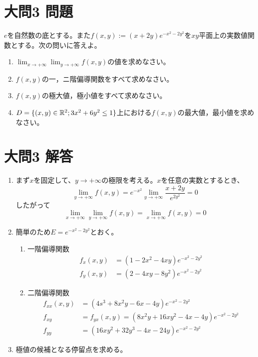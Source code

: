 \documentclass[dvipdfmx]{jsreport}
\begin{document}
\section{大問3 問題}
\begin{tcolorbox} %
	$e$を自然数の底とする。また$f(x, y):= (x+ 2y)e^{-x^2- 2y^2}$を$xy$平面上の実数値関数とする。次の問いに答えよ。
\begin{enumerate}
	\item $\lim_{x\to +\infty}\lim_{y\to +\infty} f(x, y)$の値を求めなさい。
	\item $f(x, y)$の一，ニ階偏導関数をすべて求めなさい。
	\item $f(x, y)$の極大値，極小値をすべて求めなさい。
	\item $D= \{(x, y)\in \mathbb{R}^2; 3x^2+ 6y^2\le 1\}$上における$f(x, y)$の最大値，最小値を求めなさい。
\end{enumerate}
\end{tcolorbox}

\section{大問3 解答}
\begin{souanswer} %
\begin{enumerate}
    \item まず$x$を固定して、$y\to +\infty$の極限を考える。$x$を任意の実数とするとき、
\begin{equation*}
    \lim_{y\to +\infty} f(x, y)= e^{-x^2}\lim_{y\to +\infty} \frac{x+ 2y}{e^{2y^2}}= 0
\end{equation*}
    したがって
\begin{equation*}
    \lim_{x\to +\infty}\lim_{y\to +\infty} f(x, y)= \lim_{x\to +\infty} f(x, y)= 0
\end{equation*}
    \item 簡単のため$E= e^{-x^2- 2y^2}$とおく。
\begin{enumerate}
    \item 一階偏導関数
\begin{align*}
    f_x(x, y)&= (1- 2x^2- 4xy)e^{-x^2- 2y^2}\\
    f_y(x, y)&= (2- 4xy- 8y^2)e^{-x^2- 2y^2}
\end{align*}
    \item 二階偏導関数
\begin{align*}
    f_{xx}(x, y)&= (4s^3+ 8x^2y- 6x- 4y)e^{-x^2- 2y^2}\\
    f_{xy}&= f_{yx}(x, y)= (8x^2y+ 16xy^2- 4x- 4y)e^{-x^2- 2y^2}\\
    f_{yy}&= (16xy^2+ 32y^3- 4x- 24y)e^{-x^2- 2y^2}
\end{align*}
\end{enumerate}
    \item 極値の候補となる停留点を求める。
\end{enumerate}
\end{souanswer}
\end{document}
